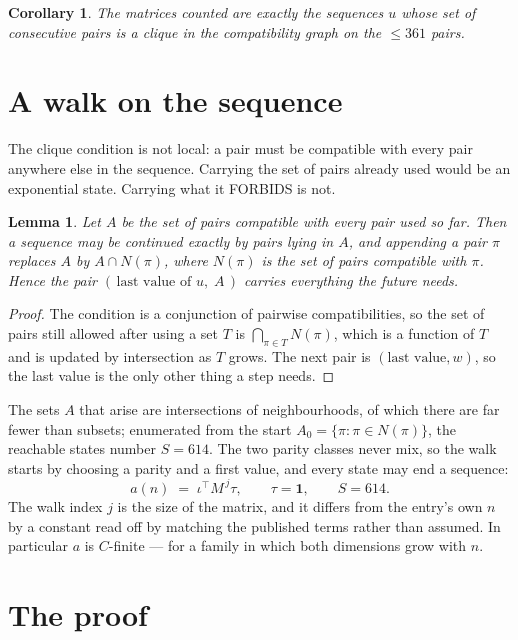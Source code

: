 \documentclass[11pt,a4paper]{article}
\theoremstyle{plain}
\newtheorem{lemma}[theorem]{Lemma}
\newtheorem{corollary}[theorem]{Corollary}
\theoremstyle{definition}
\begin{document}
\begin{corollary}
The matrices counted are exactly the sequences $u$ whose set of consecutive pairs is a clique in
the compatibility graph on the $\le 361$ pairs.
\end{corollary}

\section{A walk on the sequence}

The clique condition is not local: a pair must be compatible with every pair anywhere else in
the sequence. Carrying the set of pairs already used would be an exponential state. Carrying
what it FORBIDS is not.

\begin{lemma}\label{lem:lump}
Let $A$ be the set of pairs compatible with every pair used so far. Then a sequence may be
continued exactly by pairs lying in $A$, and appending a pair $\pi$ replaces $A$ by
$A\cap N(\pi)$, where $N(\pi)$ is the set of pairs compatible with $\pi$. Hence the pair
$(\,\text{last value of }u,\;A\,)$ carries everything the future needs.
\end{lemma}

\begin{proof}
The condition is a conjunction of pairwise compatibilities, so the set of pairs still allowed
after using a set $T$ is $\bigcap_{\pi\in T}N(\pi)$, which is a function of $T$ and is updated
by intersection as $T$ grows. The next pair is $(\text{last value},w)$, so the last value is
the only other thing a step needs.
\end{proof}

The sets $A$ that arise are intersections of neighbourhoods, of which there are far fewer than
subsets; enumerated from the start $A_0=\{\pi:\pi\in N(\pi)\}$, the reachable states number
$S=614$. The two parity classes never mix, so the walk starts by choosing a parity and a first
value, and every state may end a sequence:
\[
a(n)\;=\;\iota^{\!\top}M^{\,j}\tau ,\qquad \tau=\mathbf{1},\qquad S=614.
\]
The walk index $j$ is the size of the matrix, and it differs from the entry's own $n$ by a
constant read off by matching the published terms rather than assumed. In particular $a$ is
$C$-finite --- for a family in which both dimensions grow with $n$.

\section{The proof}
\end{document}
